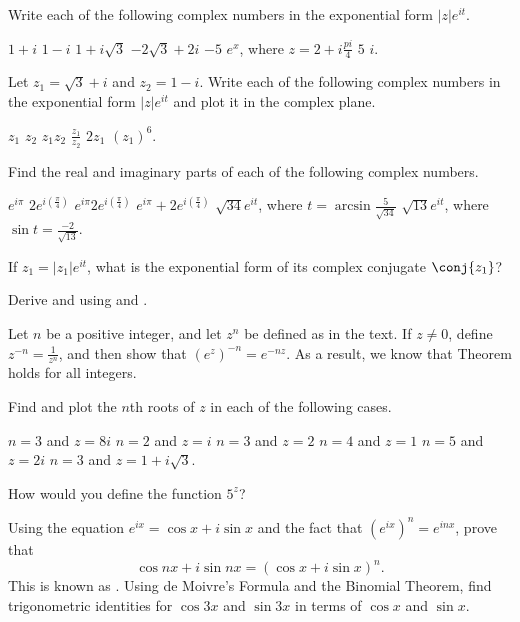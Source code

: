 \begin{exercises}

Write each of the following complex numbers
in the exponential form $|z|e^{it}$.
\begin{exenum}
\x
$1+i$
\x
$1-i$
\x
$1+i\sqrt3$
\x
$-2\sqrt3+2i$
\x
$-5$
\x
$e^x$, where $z=2+i\frac{pi}4$
\x
$5$
\x
$i$.
\end{exenum}

Let $z_1=\sqrt3+i$ and $z_2=1-i$.
Write each of the following complex numbers
in the exponential form $|z|e^{it}$
and plot it in the complex plane.
\begin{exenum}
\x
$z_1$
\x
$z_2$
\x
$z_1z_2$
\x
$\frac{z_1}{z_2}$
\x
$2z_1$
\x
$(z_1)^6$.
\end{exenum}

Find the real and imaginary parts of each
of the following complex numbers.
\begin{exenum}
\x
$e^{i\pi}$
\x
$2e^{i(\frac{\pi}4)}$
\x
$e^{i\pi}2e^{i(\frac{\pi}4)}$
\x
$e^{i\pi} + 2e^{i(\frac{\pi}4)}$
\x
$\sqrt{34}e^{it}$, where $t=\arcsin \frac{5}{\sqrt{34}}$
\x
$\sqrt{13}e^{it}$, where $\sin t= \frac{-2}{\sqrt{13}}$.
\end{exenum}

If $z_1=|z_1|e^{it}$, what is the exponential
form of its complex conjugate $\conj{z_1}$?

Derive  and 
using  and .

Let $n$ be a positive integer, and let $z^n$
be defined as in the text.
If $z \ne 0$, define
$z^{-n} = \frac1{z^n}$,
and then show that
$(e^z)^{-n} = e^{-nz}$.
As a result, we know that
Theorem  holds for all integers.

Find and plot the $n$th roots of $z$
in each of the following cases.
\begin{exenum}
\x
$n=3$ and $z=8i$
\x
$n=2$ and $z=i$
\x
$n=3$ and $z=2$
\x
$n=4$ and $z=1$
\x
$n=5$ and $z=2i$
\x
$n=3$ and $z=1+i\sqrt3$.
\end{exenum}

How would you define the function $5^z$?

\begin{exenum}
\x
Using the equation $e^{ix}=\cos x + i \sin x$
and the fact that $(e^{ix})^n = e^{inx}$,
prove that
\[
\cos nx + i \sin nx = (\cos x + i \sin x)^n
.
\]
This is known as .
\x
Using de Moivre's Formula and the Binomial Theorem,
find trigonometric identities for $\cos 3x$ and
$\sin 3x$ in terms of $\cos x$ and $\sin x$.
\end{exenum}


\end{exercises}
